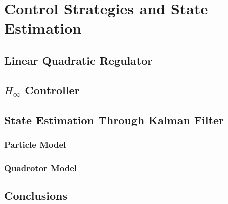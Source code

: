 \chapter{Control Strategies and State Estimation} \label{ch:controlandestimation}


\section{Linear Quadratic Regulator}


\section{$H_\infty$ Controller}


\section{State Estimation Through Kalman Filter}

\subsection{Particle Model}

\subsection{Quadrotor Model}

\section{Conclusions}